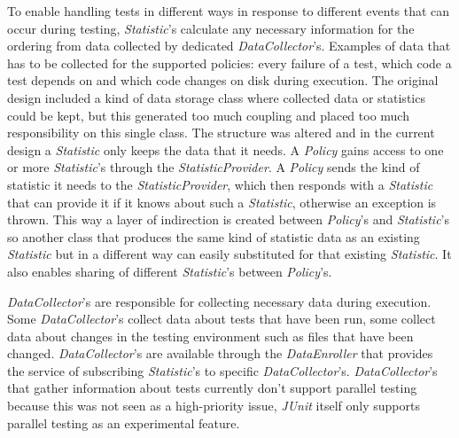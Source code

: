 \documentclass[i2]{oss}
\newcommand{\class}[1]{\emph{#1}}
\newcommand{\junit}{\emph{JUnit }}
\begin{document}
To enable handling tests in different ways in response to different 
events that can occur during testing, \class{Statistic}'s calculate any 
necessary information for the ordering from data collected by dedicated 
\class{DataCollector}'s. %
Examples of data that has to be collected for the supported policies: 
every failure of a test, which code a test depends on and which code 
changes on disk during execution.
The original design included a kind of data storage class where collected
data or statistics could be kept, but this generated too much coupling
and placed too much responsibility on this single class.
The structure was altered and in the current design a \class{Statistic}
only keeps the data that it needs.
A \class{Policy} gains access to one or more \class{Statistic}'s through
the \class{StatisticProvider}.
A \class{Policy} sends the kind of statistic it needs to the 
\class{StatisticProvider}, which then responds with a \class{Statistic}
that can provide it if it knows about such a \class{Statistic}, otherwise
an exception is thrown.
This way a layer of indirection is created between \class{Policy}'s and
\class{Statistic}'s so another class that produces the same kind of 
statistic data as an existing \class{Statistic} but in a different way 
can easily substituted for that existing \class{Statistic}. 
It also enables sharing of different \class{Statistic}'s between 
\class{Policy}'s.

\class{DataCollector}'s are responsible for collecting necessary data 
during execution.
Some \class{DataCollector}'s collect data about tests that have been run,
some collect data about changes in the testing environment such as files that have been changed.
\class{DataCollector}'s are available through the \class{DataEnroller}
that provides the service of subscribing \class{Statistic}'s to specific
\class{DataCollector}'s.
\class{DataCollector}'s that gather information about tests currently
don't support parallel testing because this was not seen as a 
high-priority issue, \junit itself only supports parallel testing as an
experimental feature.
\end{document}
